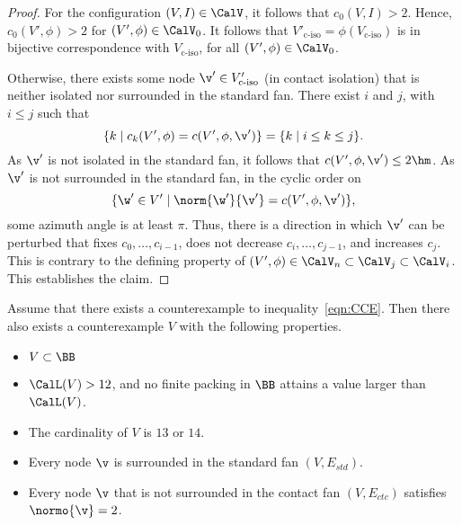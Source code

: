 \begin{proof}
For the configuration $(V,I)\in \CalV$, it follows that $c_0(V,I) >2$.
Hence, $c_0(V',\phi)>2$ for $(V',\phi)\in\CalV_0$.  It follows
that $V'_{\text{c-iso}}=\phi(V_{\text{c-iso}})$ is in bijective correspondence with
$V_{\text{c-iso}}$, for all $(V',\phi)\in \CalV_0$.

Otherwise, there exists some node $\v'\in V'_{\text{c-iso}}$ (in contact
isolation) that is neither isolated nor surrounded in the standard fan.
There exist $i$ and $j$, with $i\le j$ such that
\begin{displaymath}
\{k\mid c_k(V',\phi) = c(V',\phi,\v')\} = \{k\mid i\le k\le j\}.
\end{displaymath}
As $\v'$ is not isolated in the standard fan, it
follows that $c(V',\phi,\v') \le 2\hm$.  As $\v'$ is not surrounded in the
standard fan, in the cyclic order on
\begin{displaymath}
\{\w'\in V' \mid \norm{\w'}{\v'} = c(V',\phi,\v')\},
\end{displaymath}
some azimuth angle is at least $\pi$.
Thus, there is a direction in which $\v'$ can be perturbed
that  fixes $c_0,\ldots,c_{i-1}$, does not decrease $c_i,\ldots,c_{j-1}$, and increases $c_j$.
This is contrary to the defining property of
$(V',\phi)\in\CalV_n\subset\CalV_j\subset\CalV_i$.  This establishes the claim.
\end{proof}



\begin{lemma}[]\label{lemma:CE} 
  Assume that there exists a counterexample to
  inequality~\ref{eqn:CCE}.  Then there also exists a counterexample
  $V$ with the following properties.
\begin{itemize}
\item $V\subset \BB$
\item $\CalL(V) > 12$, and no finite packing in $\BB$ attains a value
  larger than $\CalL(V)$.
\item The cardinality of $V$ is $13$ or $14$.
\item Every node $\v$ is surrounded in the standard fan $(V,E_{std})$.
\item Every node $\v$ that is not surrounded in the contact
fan $(V,E_{ctc})$ satisfies $\normo{\v}=2$.
\end{itemize}
\end{lemma}

